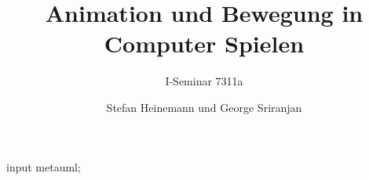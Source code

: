 \documentclass[oneside,DIV12,BCOR0.5cm,bibliography=totoc]{template}
\begin{document}
\begin{empfile}
\begin{empcmds}
input metauml;
\end{empcmds}


\title{Animation und Bewegung in Computer Spielen}
\subtitle{I-Seminar 7311a}

\author{Stefan Heinemann und George Sriranjan}

\maketitle



\tableofcontents











\end{empfile}
\end{document}
